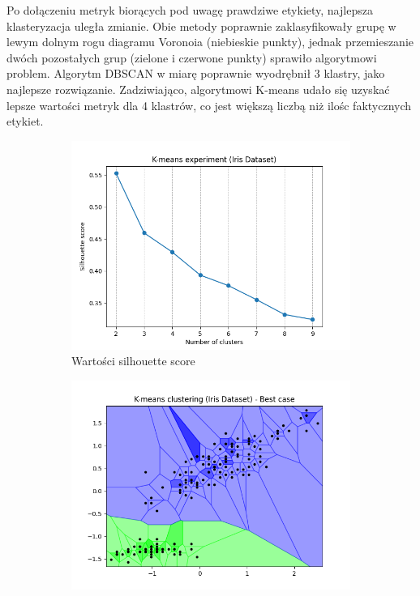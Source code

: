 \documentclass[12pt]{article}
\begin{document}
Po dołączeniu metryk biorących pod uwagę prawdziwe etykiety, najlepsza klasteryzacja uległa zmianie.
Obie metody poprawnie zaklasyfikowały grupę w lewym dolnym rogu diagramu Voronoia (niebieskie punkty), 
jednak przemieszanie dwóch pozostałych grup (zielone i czerwone punkty) sprawiło algorytmowi problem.
Algorytm DBSCAN w miarę poprawnie wyodrębnił 3 klastry, jako najlepsze rozwiązanie.
Zadziwiająco, algorytmowi K-means udało się uzyskać lepsze wartości metryk dla 4 klastrów, co jest większą liczbą niż ilośc faktycznych etykiet.


\begin{figure}[H]
    \centering
    \begin{subfigure}[t]{0.24\textwidth}
        \includegraphics[width=\linewidth]{img/other_datasets/iris_kmeans_silhouette.png}
        \caption{Wartości silhouette score}
    \end{subfigure}
    \hfill
    \begin{subfigure}[t]{0.24\textwidth}
        \includegraphics[width=\linewidth]{img/other_datasets/iris_kmeans_blind_best.png}

\end{subfigure}
\end{figure}
\end{document}
